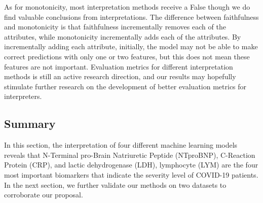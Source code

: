 As for monotonicity, most interpretation methods receive a False though we do find valuable conclusions from interpretations. The difference between faithfulness and monotonicity is that faithfulness incrementally removes each of the attributes, while monotonicity incrementally adds each of the attributes. By incrementally adding each attribute, initially, the model may not be able to make correct predictions with only one or two features, but this does not mean these features are not important. Evaluation metrics for different interpretation methods is still an active research direction, and our results may hopefully stimulate further research on the development of better evaluation metrics for interpreters.


\color{black}

\subsection{Summary}

In this section, the interpretation of four different machine learning models reveals that N-Terminal pro-Brain Natriuretic Peptide (NTproBNP), C-Reaction Protein (CRP), and lactic dehydrogenase (LDH), lymphocyte (LYM) are the four most important biomarkers that indicate the severity level of COVID-19 patients. In the next section, we further validate our methods on two datasets to corroborate our proposal.




